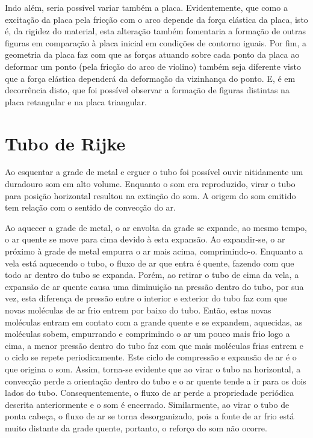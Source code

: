Indo além, seria possível variar também a placa. Evidentemente, que como a excitação da placa pela fricção com o arco depende da força elástica da placa, isto é, da rigidez do material, esta alteração também fomentaria a formação de outras figuras em comparação à placa inicial em condições de contorno iguais. Por fim, a geometria da placa faz com que as forças atuando sobre cada ponto da placa ao deformar um ponto (pela fricção do arco de violino) também seja diferente visto que a força elástica dependerá da deformação da vizinhança do ponto. E, é em decorrência disto, que foi possível observar a formação de figuras distintas na placa retangular e na placa triangular. 

\section{Tubo de Rijke}

Ao esquentar a grade de metal e erguer o tubo foi possível ouvir nitidamente um duradouro som em alto volume. Enquanto o som era reproduzido, virar o tubo para posição horizontal resultou na extinção do som. A origem do som emitido tem relação com o sentido de convecção do ar.

Ao aquecer a grade de metal, o ar envolta da grade se expande, ao mesmo tempo, o ar quente se move para cima devido à esta expansão. Ao expandir-se, o ar próximo à grade de metal empurra o ar mais acima, comprimindo-o. Enquanto a vela está aquecendo o tubo, o fluxo de ar que entra é quente, fazendo com que todo ar dentro do tubo se expanda. Porém, ao retirar o tubo de cima da vela, a expansão de ar quente causa uma diminuição na pressão dentro do tubo, por sua vez, esta diferença de pressão entre o interior e exterior do tubo faz com que novas moléculas de ar frio entrem por baixo do tubo. Então, estas novas moléculas entram em contato com a grande quente e se expandem, aquecidas, as moléculas sobem, empurrando e comprimindo o ar um pouco mais frio logo a cima, a menor pressão dentro do tubo faz com que mais moléculas frias entrem e o ciclo se repete periodicamente. Este ciclo de compressão e expansão de ar é o que origina o som. Assim, torna-se evidente que ao virar o tubo na horizontal, a convecção perde a orientação dentro do tubo e o ar quente tende a ir para os dois lados do tubo. Consequentemente, o fluxo de ar perde a propriedade periódica descrita anteriormente e o som é encerrado. Similarmente, ao virar o tubo de ponta cabeça, o fluxo de ar se torna desorganizado, pois a fonte de ar frio está muito distante da grade quente, portanto, o reforço do som não ocorre.

